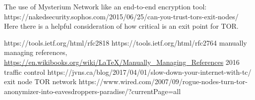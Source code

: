 \documentclass[12pt]{article}
\begin{document}
	The use of Mysterium Network like an end-to-end encryption tool: https://nakedsecurity.sophos.com/2015/06/25/can-you-trust-tors-exit-nodes/
	Here there is a helpful consideration of how critical is an exit point for TOR.

	\pagebreak

	
	\begin{thebibliography}{1}
			https://tools.ietf.org/html/rfc2818
			https://tools.ietf.org/html/rfc2764
			manually managing references, 
			\url{https://en.wikibooks.org/wiki/LaTeX/Manually_Managing_References}
			2016
			traffic control
			https://jvns.ca/blog/2017/04/01/slow-down-your-internet-with-tc/
			exit node TOR network
			https://www.wired.com/2007/09/rogue-nodes-turn-tor-anonymizer-into-eavesdroppers-paradise/?currentPage=all

	\end{thebibliography}
		
	\pagebreak
	
	
\end{document}
